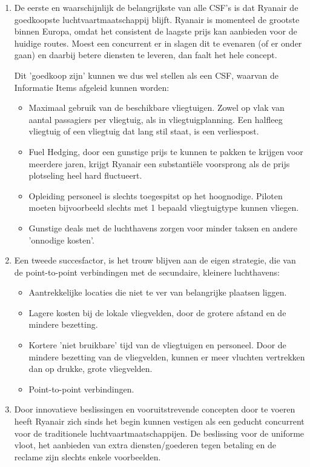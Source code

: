\documentclass{article}
\begin{document}
\begin{enumerate}
\item De eerste en waarschijnlijk de belangrijkste van alle CSF's is dat Ryanair de goedkoopste luchtvaartmaatschappij blijft. Ryanair is momenteel de grootste binnen Europa, omdat het consistent de laagste prijs kan aanbieden voor de huidige routes. Moest een concurrent er in slagen dit te evenaren (of er onder gaan) en daarbij betere diensten te leveren, dan faalt het hele concept. 

Dit 'goedkoop zijn' kunnen we dus wel stellen als een CSF, waarvan de Informatie Items afgeleid kunnen worden:

\begin{itemize}
\item Maximaal gebruik van de beschikbare vliegtuigen. Zowel op vlak van aantal passagiers per vliegtuig, als in vliegtuigplanning. Een halfleeg vliegtuig of een vliegtuig dat lang stil staat, is een verliespost.
\item Fuel Hedging, door een gunstige prijs te kunnen te pakken te krijgen voor meerdere jaren, krijgt Ryanair een substanti\"ele voorsprong als de prijs plotseling heel hard fluctueert.
\item Opleiding personeel is slechts toegespitst op het hoognodige. Piloten moeten bijvoorbeeld slechts met 1 bepaald vliegtuigtype kunnen vliegen.
\item Gunstige deals met de luchthavens zorgen voor minder taksen en andere 'onnodige kosten'.
\end{itemize}

\item Een tweede succesfactor, is het trouw blijven aan de eigen strategie, die van de point-to-point verbindingen met de secundaire, kleinere luchthavens:

\begin{itemize}
\item Aantrekkelijke locaties die niet te ver van belangrijke plaatsen liggen.
\item Lagere kosten bij de lokale vliegvelden, door de grotere afstand en de mindere bezetting.
\item Kortere 'niet bruikbare' tijd van de vliegtuigen en personeel. Door de mindere bezetting van de vliegvelden, kunnen er meer vluchten vertrekken dan op drukke, grote vliegvelden.
\item Point-to-point verbindingen.
\end{itemize}

\item Door innovatieve beslissingen en vooruitstrevende concepten door te voeren heeft Ryanair zich sinds het begin kunnen vestigen als een geducht concurrent voor de traditionele luchtvaartmaatschappijen. De beslissing voor de uniforme vloot, het aanbieden van extra diensten/goederen tegen betaling en de reclame zijn slechts enkele voorbeelden.


\end{enumerate}
\end{document}

